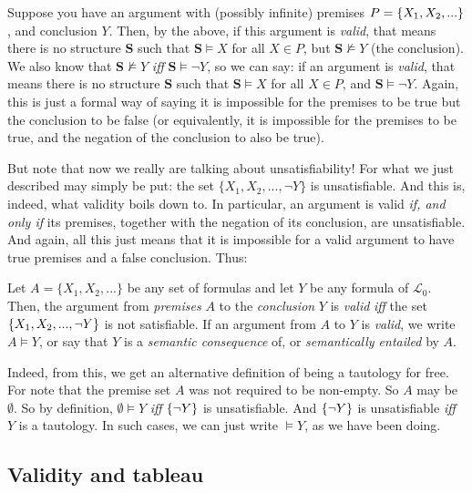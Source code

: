 Suppose you have an argument with (possibly infinite) premises $P=\{X_1, X_2, ...\}$, and conclusion $Y$. Then, by the above, if this argument is \textit{valid}, that means there is no structure $\mathbf{S}$ such that $\mathbf{S} \models X$ for all $X \in P$, but $\mathbf{S} \not\models Y$ (the conclusion). We also know that $\mathbf{S} \not\models Y$ \textit{iff} $\mathbf{S} \models \neg Y$, so we can say: if an argument is \textit{valid}, that means there is no structure $\mathbf{S}$ such that $\mathbf{S} \models X$ for all $X \in P$, and $\mathbf{S} \models \neg Y$. Again, this is just a formal way of saying it is impossible for the premises to be true but the conclusion to be false (or equivalently, it is impossible for the premises to be true, and the negation of the conclusion to also be true). 

But note that now we really are talking about unsatisfiability! For what we just described may simply be put: the set $\{X_1, X_2, ..., \neg Y\}$ is unsatisfiable. And this is, indeed, what validity boils down to. In particular, an argument is valid \textit{if, and only if} its premises, together with the negation of its conclusion, are unsatisfiable. And again, all this just means that it is impossible for a valid argument to have true premises and a false conclusion. Thus:

\begin{defn}[Validity]
Let $A=\{X_1, X_2, ...\}$ be any set of formulas and let $Y$ be any formula of $\mathcal{L}_0$. Then, the argument from \textit{premises} $A$ to the \textit{conclusion} $Y$ is \textit{valid} \textit{iff} the set $\{X_1, X_2, ..., \neg Y\}$ is not satisfiable. If an argument from $A$ to $Y$ is \textit{valid}, we write $A \models Y$, or say that $Y$ is a \textit{semantic consequence} of, or \textit{semantically entailed} by $A$.  
\end{defn}

\begin{remark}
Indeed, from this, we get an alternative definition of being a tautology for free. For note that the premise set $A$ was not required to be non-empty. So $A$ may be $\emptyset$. So by definition, $\emptyset \models Y$ \textit{iff} $\{\neg Y\}$ is unsatisfiable. And $\{\neg Y\}$ is unsatisfiable \textit{iff} $Y$ is a tautology. In such cases, we can just write $\models Y$, as we have been doing. 
\end{remark}

\subsection{Validity and tableau}

